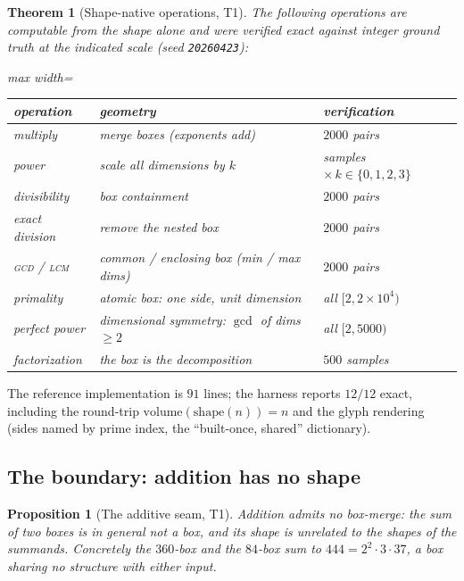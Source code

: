 \documentclass[11pt]{article}
\newtheorem{theorem}{Theorem}
\newtheorem{proposition}{Proposition}
\begin{document}
\begin{theorem}[Shape-native operations, T1]
The following operations are computable from the shape alone and were verified exact against integer ground
truth at the indicated scale (seed \texttt{20260423}):
\begin{center}
\begin{adjustbox}{max width=\linewidth}\begin{tabular}{lll}
\toprule
operation & geometry & verification \\
\midrule
multiply & merge boxes (exponents add) & $2000$ pairs \\
power & scale all dimensions by $k$ & samples $\times\, k\in\{0,1,2,3\}$ \\
divisibility & box containment & $2000$ pairs \\
exact division & remove the nested box & $2000$ pairs \\
\textsc{gcd} / \textsc{lcm} & common / enclosing box (min / max dims) & $2000$ pairs \\
primality & atomic box: one side, unit dimension & all $[2,2\!\times\!10^4)$ \\
perfect power & dimensional symmetry: $\gcd$ of dims $\ge 2$ & all $[2,5000)$ \\
factorization & the box \emph{is} the decomposition & $500$ samples \\
\bottomrule
\end{tabular}\end{adjustbox}
\end{center}
\end{theorem}

The reference implementation is $91$ lines; the harness reports $12/12$ exact, including the round-trip
$\mathrm{volume}(\mathrm{shape}(n))=n$ and the glyph rendering (sides named by prime index, the
``built-once, shared'' dictionary).

\subsection{The boundary: addition has no shape}

\begin{proposition}[The additive seam, T1]
Addition admits no box-merge: the sum of two boxes is in general not a box, and its shape is unrelated to
the shapes of the summands. Concretely the $360$-box and the $84$-box sum to $444=2^2\cdot 3\cdot 37$, a box
sharing no structure with either input.
\end{proposition}
\end{document}
